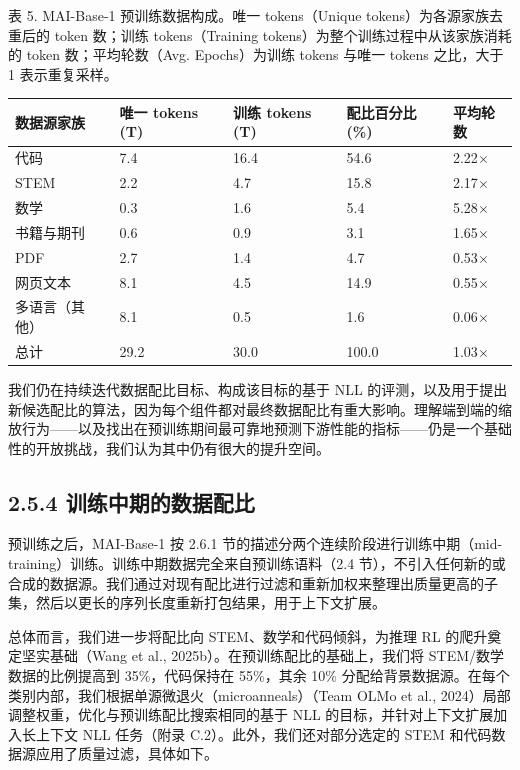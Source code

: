 表 5. MAI-Base-1 预训练数据构成。唯一 tokens（Unique tokens）为各源家族去重后的 token 数；训练 tokens（Training tokens）为整个训练过程中从该家族消耗的 token 数；平均轮数（Avg. Epochs）为训练 tokens 与唯一 tokens 之比，大于 1 表示重复采样。

{\def\LTcaptype{none} %
\begin{longtable}[]{@{}|l|l|l|l|l|@{}}
\toprule\noalign{}
\endhead
\bottomrule\noalign{}
\endlastfoot
\hline
数据源家族 & 唯一 tokens (T) & 训练 tokens (T) & 配比百分比
(\%) & 平均轮数 \\
\hline
代码 & 7.4 & 16.4 & 54.6 & 2.22$\times$ \\
\hline
STEM & 2.2 & 4.7 & 15.8 & 2.17$\times$ \\
\hline
数学 & 0.3 & 1.6 & 5.4 & 5.28$\times$ \\
\hline
书籍与期刊 & 0.6 & 0.9 & 3.1 & 1.65$\times$ \\
\hline
PDF & 2.7 & 1.4 & 4.7 & 0.53$\times$ \\
\hline
网页文本 & 8.1 & 4.5 & 14.9 & 0.55$\times$ \\
\hline
多语言（其他） & 8.1 & 0.5 & 1.6 & 0.06$\times$ \\
\hline
总计 & 29.2 & 30.0 & 100.0 & 1.03$\times$ \\
\hline
\end{longtable}
}

我们仍在持续迭代数据配比目标、构成该目标的基于 NLL 的评测，以及用于提出新候选配比的算法，因为每个组件都对最终数据配比有重大影响。理解端到端的缩放行为——以及找出在预训练期间最可靠地预测下游性能的指标——仍是一个基础性的开放挑战，我们认为其中仍有很大的提升空间。

\subsection{2.5.4 训练中期的数据配比}\label{midtraining-data-mixture}

预训练之后，MAI-Base-1 按 2.6.1 节的描述分两个连续阶段进行训练中期（mid-training）训练。训练中期数据完全来自预训练语料（2.4 节），不引入任何新的或合成的数据源。我们通过对现有配比进行过滤和重新加权来整理出质量更高的子集，然后以更长的序列长度重新打包结果，用于上下文扩展。

总体而言，我们进一步将配比向 STEM、数学和代码倾斜，为推理 RL 的爬升奠定坚实基础（Wang et al., 2025b）。在预训练配比的基础上，我们将 STEM/数学数据的比例提高到 35\%，代码保持在 55\%，其余 10\% 分配给背景数据源。在每个类别内部，我们根据单源微退火（microanneals）（Team OLMo et al., 2024）局部调整权重，优化与预训练配比搜索相同的基于 NLL 的目标，并针对上下文扩展加入长上下文 NLL 任务（附录 C.2）。此外，我们还对部分选定的 STEM 和代码数据源应用了质量过滤，具体如下。


